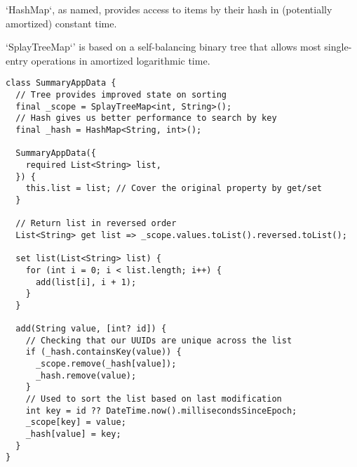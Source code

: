 `HashMap`, as named, provides access to items by their hash in (potentially amortized) constant time.

`SplayTreeMap`' is based on a self-balancing binary tree that allows most single-entry operations in amortized 
logarithmic time.

\begin{lstlisting}
class SummaryAppData {
  // Tree provides improved state on sorting
  final _scope = SplayTreeMap<int, String>();
  // Hash gives us better performance to search by key
  final _hash = HashMap<String, int>();

  SummaryAppData({
    required List<String> list,
  }) {
    this.list = list; // Cover the original property by get/set
  }

  // Return list in reversed order
  List<String> get list => _scope.values.toList().reversed.toList();

  set list(List<String> list) {
    for (int i = 0; i < list.length; i++) {
      add(list[i], i + 1);
    }
  }

  add(String value, [int? id]) {
    // Checking that our UUIDs are unique across the list
    if (_hash.containsKey(value)) {
      _scope.remove(_hash[value]);
      _hash.remove(value);
    }
    // Used to sort the list based on last modification 
    int key = id ?? DateTime.now().millisecondsSinceEpoch;
    _scope[key] = value;
    _hash[value] = key;
  }
}
\end{lstlisting}

